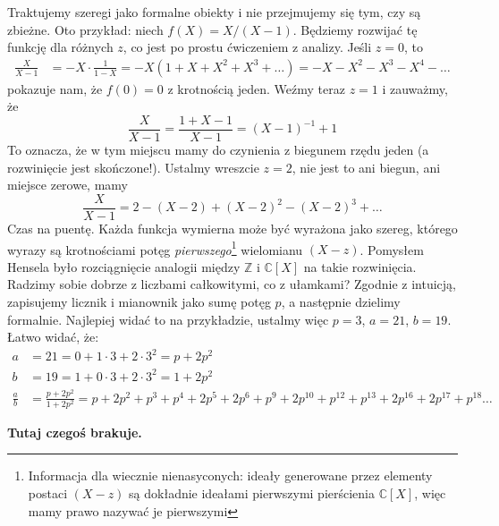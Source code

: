 \documentclass[a4paper,fleqn,9pt]{extarticle}
\begin{document}
Traktujemy szeregi jako formalne obiekty i nie przejmujemy się tym, czy są zbieżne. Oto przykład: niech $f(X) = {X}/{(X-1)}$.
Będziemy rozwijać tę funkcję dla różnych $z$, co jest po prostu ćwiczeniem z analizy. Jeśli $z=0$, to 
\begin{align*}
\frac{X}{X-1} & 
 = -X \cdot \frac{1}{1-X} 
 = -X (1+X+X^2+X^3+\dots)
 = -X -X^2-X^3-X^4-\dots
\end{align*}
pokazuje nam, że $f(0) = 0$ z krotnością jeden. Weźmy teraz $z=1$ i zauważmy, że
\begin{equation*}
\frac{X}{X-1}
 = \frac{1+X-1}{X-1}
 = (X-1)^{-1}+ 1
\end{equation*}
To oznacza, że w tym miejscu mamy do czynienia z biegunem rzędu jeden (a rozwinięcie jest skończone!). Ustalmy wreszcie $z=2$, nie jest to ani biegun, ani miejsce zerowe, mamy
\begin{equation*}
\frac{X}{X-1}
 = 2 - (X-2) + (X-2)^2-(X-2)^3+\dots
\end{equation*}
Czas na puentę. Każda funkcja wymierna może być wyrażona jako szereg, którego wyrazy są krotnościami potęg \emph{pierwszego}\footnote{Informacja dla wiecznie nienasyconych: ideały generowane przez elementy postaci $(X-z)$ są dokładnie ideałami pierwszymi pierścienia $\mathbb C[X]$, więc mamy prawo nazywać je pierwszymi} wielomianu $(X-z)$. Pomysłem Hensela było rozciągnięcie analogii między $\mathbb Z$ i $\mathbb C[X]$ na takie rozwinięcia. Radzimy sobie dobrze z liczbami całkowitymi, co z ułamkami? Zgodnie z intuicją, zapisujemy licznik i mianownik jako sumę potęg $p$, a następnie dzielimy formalnie. Najlepiej widać to na przykładzie, ustalmy więc $p=3$, $a=21$, $b=19$. Łatwo widać, że:
\begin{align*}
a & = 21= 0+1\cdot 3+2\cdot 3^2 = p+2p^2\\
b & = 19 = 1 + 0 \cdot 3 + 2 \cdot 3^2 = 1+2p^2 \\
\frac{a}{b} &
 = \frac{p+2p^2}{1+2p^2}
 = p + 2p^2 + p^3 + p^4 + 2p^5 + 2p^6 + p^9 + 2p^{10} + p^{12} + p^{13} + 2p^{16} + 2p^{17} + p^{18}\dots
\end{align*}



\textbf{Tutaj czegoś brakuje.}

\end{document}
